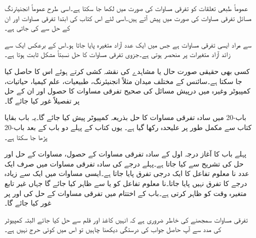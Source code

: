 عموماً طبعی تعلقات کو تفرقی مساوات کی صورت میں لکھا جا سکتا ہے۔اسی طرح عموماً انجنیئرنگ مسائل تفرقی مساوات کی صورت میں پیش آتے ہیں۔اسی لئے  اس کتاب کی ابتدا تفرقی مساوات اور ان کے حل سے کی جاتی ہے۔

 سے مراد ایسی تفرقی مساوات ہے جس میں ایک عدد آزاد متغیرہ پایا جاتا ہو۔اس کے برعکس  ایک سے زائد آزاد متغیرات پر منحصر ہوتی ہے۔جزوی تفرقی مساوات کا حل نسبتاً مشکل ثابت ہوتا ہے۔

کسی بھی حقیقی صورت حال یا مشاہدے کی نقشہ کشی کرتے ہوئے  اس کا  حاصل کیا جا سکتا ہے۔سائنس کے مختلف میدان مثلاً انجنیئرنگ، طبیعیات، علم کیمیا، حیاتیات، کمپیوٹر وغیرہ میں درپیش مسائل کی صحیح تفرقی مساوات کا حصول اور ان کے حل پر تفصیلاً غور کیا جائے گا۔

باب-20 میں سادہ تفرقی مساوات کا حل بذریعہ کمپیوٹر  پیش کیا جائے گا۔یہ باب بقایا کتاب سے مکمل طور پر علیحدہ رکھا گیا ہے۔ یوں کتاب کے پہلے  دو باب کے بعد باب-20 پڑھا جا سکتا ہے۔

پہلے باب کا آغاز  درجہ اول کے سادہ تفرقی مساوات کے حصول، مساوات کے حل اور حل کی تشریح  سے کیا جاتا ہے۔پہلے درجے کی سادہ تفرقی مساوات میں صرف ایک عدد نا معلوم تفاعل کا ایک درجی تفرق پایا جاتا ہے۔ایسی مساوات میں ایک سے زیادہ درجے کا تفرق نہیں پایا جاتا۔نا معلوم تفاعل کو  یا  سے ظاہر کیا جائے گا جہاں غیر تابع متغیرہ    وقت کو ظاہر کرتی ہے۔باب کے اختتام میں تفرقی مساوات کے حل کی   اور  پر غور کیا جائے گا۔

تفرقی مساوات سمجھنے کی خاطر ضروری ہے کہ انہیں کاغذ اور قلم سے حل کیا جائے البتہ کمپیوٹر کی مدد سے آپ حاصل جواب کی درستگی دیکھنا چاہیں تو اس میں کوئی حرج نہیں ہے۔

